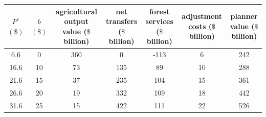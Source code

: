 \begin{tabular}{ccccccc}
\toprule
\makecell[c]{$P^e$ \\ $(\$)$} & \makecell[c]{$b$ \\ $(\$)$} & \makecell[c]{agricultural \\ output value \\ ($\$$ billion)} & \makecell[c]{net \\ transfers \\ ($\$$ billion)} & \makecell[c]{forest \\ services \\ ($\$$ billion)} & \makecell[c]{adjustment \\ costs \\ ($\$$ billion)} & \makecell[c]{planner \\ value \\ ($\$$ billion)} \\
\midrule
 6.6 & 0 & 360 & 0 & -113 & 6 & 242 \\
 16.6 & 10 & 73 & 135 & 89 & 10 & 288 \\
 21.6 & 15 & 37 & 235 & 104 & 15 & 361 \\
 26.6 & 20 & 19 & 332 & 109 & 18 & 442 \\
 31.6 & 25 & 15 & 422 & 111 & 22 & 526 \\
\bottomrule
\end{tabular}
